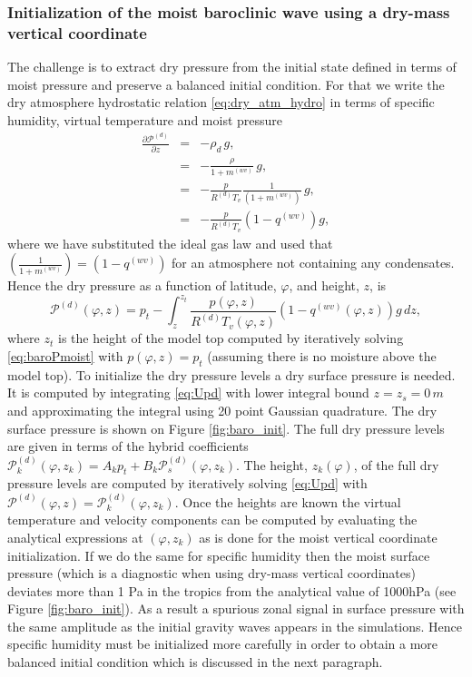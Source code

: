 \documentclass{agujournal}
\begin{document}
{\subsubsection{Initialization of the moist baroclinic wave using a dry-mass vertical coordinate}
The challenge is to extract dry pressure from the initial state defined in terms of moist pressure and preserve a balanced initial condition. For that we write the dry atmosphere hydrostatic relation \eqref{eq:dry_atm_hydro} in terms of specific humidity, virtual temperature and moist pressure
\begin{eqnarray}
\frac{\partial \mathcal{P}^{(d)}}{\partial z}&=&-\rho_d\, g,\\
&=&-\frac{\rho}{1+m^{(wv)}}\, g,\\
&=&-\frac{p}{R^{(d)}T_v}\frac{1}{\left( 1+m^{(wv)}\right)}\, g,\\
&=&-\frac{p}{R^{(d)}T_v}\left(1-q^{(wv)}\right)g,
\end{eqnarray}
where we have substituted the ideal gas law and used that $\left( \frac{1}{1+m^{(wv)}} \right)=\left( 1-q^{(wv)} \right)$ for an atmosphere not containing any condensates. Hence the dry pressure as a function of latitude, $\varphi$, and height, $z$, is
\begin{equation}
{\mathcal{P}}^{(d)}(\varphi,z)=p_t-\int_z^{z_t}\frac{p(\varphi,z)}{R^{(d)} T_v(\varphi,z)}\left(1-q^{(wv)}(\varphi,z)\right) g\, dz,\label{eq:Upd}
\end{equation}
where $z_t$ is the height of the model top computed by iteratively solving \eqref{eq:baroPmoist} with $p(\varphi,z)=p_t$ (assuming there is no moisture above the model top). To initialize the dry pressure levels a dry surface pressure is needed. It is computed by integrating \eqref{eq:Upd} with lower integral bound $z=z_s=0\, m$ and approximating the integral using 20 point Gaussian quadrature. The dry surface pressure is shown on Figure \ref{fig:baro_init}. The full dry pressure levels are given in terms of the hybrid coefficients ${\mathcal{P}_k^{(d)}}(\varphi,z_k)=A_k p_t+B_k {\mathcal{P}_s^{(d)}}(\varphi,z_k)$. The height, $z_{k}(\varphi)$, of the full dry pressure levels are computed by iteratively solving \eqref{eq:Upd} with ${\mathcal{P}}^{(d)}(\varphi,z)={\mathcal{P}}_{k}^{(d)}(\varphi,z_k)$. Once the heights are known the virtual temperature and velocity components can be computed by evaluating the analytical expressions at $(\varphi,z_k)$ as is done for the moist vertical coordinate initialization. If we do the same for specific humidity then the moist surface pressure (which is a diagnostic when using dry-mass vertical coordinates) deviates more than 1 Pa in the tropics from the analytical value of 1000hPa  (see Figure \ref{fig:baro_init}). As a result a spurious zonal signal in surface pressure with the same amplitude as the initial gravity waves appears in the simulations. Hence specific humidity must be initialized more carefully in order to obtain a more balanced initial condition which is discussed in the next paragraph. 

}
\end{document}
